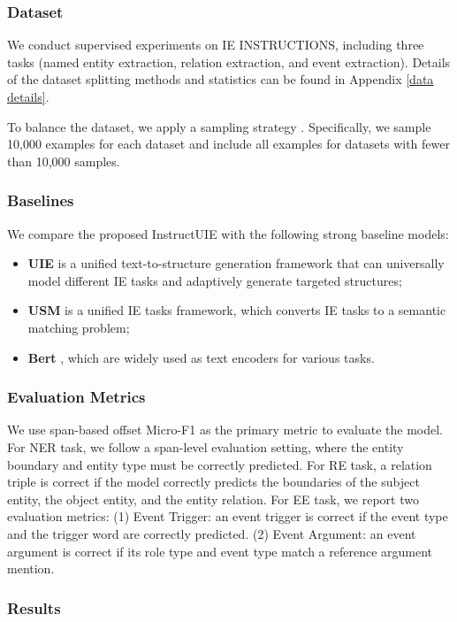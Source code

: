 \subsubsection{Dataset}
We conduct supervised experiments on IE INSTRUCTIONS, including three tasks (named entity extraction, relation extraction, and event extraction). 
Details of the dataset splitting methods and statistics can be found in Appendix \ref{data details}.

To balance the dataset, we apply a sampling strategy \cite{poolsawad2014balancing}. Specifically, we sample 10,000 examples for each dataset and include all examples for datasets with fewer than 10,000 samples.

\subsubsection{Baselines}
\label{supervise-baseline}
We compare the proposed InstructUIE with the following strong baseline models:
\begin{itemize}
\item \textbf{UIE} \cite{UIE} is a unified text-to-structure generation framework that can universally model different IE tasks and adaptively generate targeted structures;
\item \textbf{USM} \cite{USM} is a unified IE tasks framework, which converts IE tasks to a semantic matching problem;
\item \textbf{Bert} \cite{devlin-etal-2019-bert}, which are widely used as text encoders for various tasks.
\end{itemize}

\subsubsection{Evaluation Metrics}
We use span-based offset Micro-F1 as the primary metric to evaluate the model. For NER task, we follow a span-level evaluation setting, where the entity boundary and entity type must be correctly predicted. For RE task, a relation triple is correct if the model correctly predicts the boundaries of the subject entity, the object entity, and the entity relation. For EE task, we report two evaluation metrics: (1) Event Trigger: an event trigger is correct if the event type and the trigger word are correctly predicted. (2) Event Argument: an event argument is correct if its role type and event type match a reference argument mention.

\subsubsection{Results}

